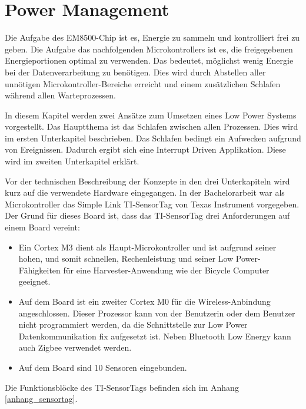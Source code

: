 
\section{Power Management}\label{t_power_management} 

Die Aufgabe des EM8500-Chip ist es, Energie zu sammeln und kontrolliert frei zu geben. Die Aufgabe das nachfolgenden Microkontrollers ist es, die freigegebenen Energieportionen optimal zu verwenden. Das bedeutet, möglichst wenig Energie bei der Datenverarbeitung zu benötigen. Dies wird durch Abstellen aller unnötigen Microkontroller-Bereiche erreicht und einem zusätzlichen Schlafen während allen Warteprozessen.

In diesem Kapitel werden zwei Ansätze zum Umsetzen eines Low Power Systems vorgestellt. Das Hauptthema ist das Schlafen zwischen allen Prozessen. Dies wird im ersten Unterkapitel beschrieben. Das Schlafen bedingt ein Aufwecken aufgrund von Ereignissen. Dadurch ergibt sich eine Interrupt Driven Applikation. Diese wird im zweiten Unterkapitel erklärt.

Vor der technischen Beschreibung der Konzepte in den drei Unterkapiteln wird kurz auf die verwendete Hardware eingegangen. In der Bachelorarbeit war als Microkontroller das Simple Link TI-SensorTag von Texas Instrument vorgegeben. Der Grund für dieses Board ist, dass das TI-SensorTag drei Anforderungen auf einem Board vereint:

\begin{minipage}{1\textwidth}
    \begin{itemize}
        \item Ein Cortex M3 dient als Haupt-Microkontroller und ist aufgrund seiner hohen, und somit schnellen, Rechenleistung und seiner Low Power-Fähigkeiten für eine Harvester-Anwendung wie der Bicycle Computer geeignet.
        \item Auf dem Board ist ein zweiter Cortex M0 für die Wireless-Anbindung angeschlossen. Dieser Prozessor kann von der Benutzerin oder dem Benutzer nicht programmiert werden, da die Schnittstelle zur Low Power Datenkommunikation fix aufgesetzt ist. Neben Bluetooth Low Energy kann auch Zigbee verwendet werden.
        \item Auf dem Board sind 10 Sensoren eingebunden.
    \end{itemize}
\end{minipage}

Die Funktionsblöcke des TI-SensorTags befinden sich im Anhang \ref{anhang_sensortag}.

